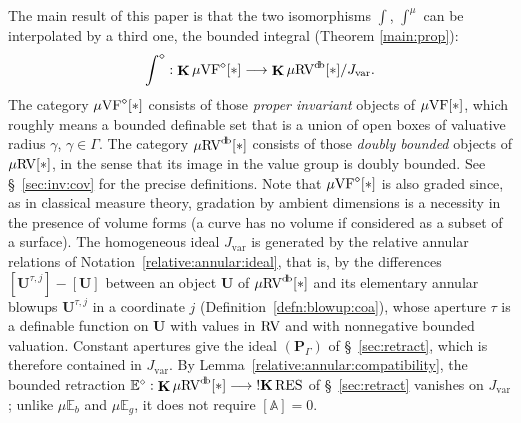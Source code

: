 \documentclass[12pt]{amsart}
\newcommand{\memph}[1]{{\color{magenta}\emph{#1}}}
\theoremstyle{plain}
\theoremstyle{definition}
\theoremstyle{remark}
\numberwithin{equation}{section}
\theoremstyle{plain}
\newcommand{\VF}{\textup{VF}}
\newcommand{\RV}{\textup{RV}}
\newcommand{\A}{\mathds{A}}
\newcommand{\0}{\emptyset}
\newcommand{\bb}[1]{\mathbb{#1}}
\newcommand{\fun}{\longrightarrow}
\newcommand{\mgVF}{{\mu} {\VF}}
\newcommand{\mgRV}{{\mu}{\RV}}
\newcommand{\RES}{\textup{RES}}
\newcommand{\mgE}{{\mu}{\bb E}}
\DeclareMathOperator{\ggk}{\mathbf{K}}
\DeclareMathOperator{\sggk}{!\mathbf{K}}
\DeclareMathOperator{\db}{d \! b}
\begin{document}
The main result of this paper is  that the two isomorphisms $\int$, $\int^\mu$ can be interpolated by a third one, the bounded integral (Theorem \ref{main:prop}):
\[
\int^\diamond : \ggk \mgVF^\diamond[*] \fun \ggk  \mgRV^{\db}[*] / J_{\mathrm{var}}.
\]
The category $\mgVF^\diamond[*]$ consists of those \memph{proper invariant} objects of $\mgVF[*]$, which roughly means a bounded definable set that is a union of open boxes of valuative radius $\gamma$, $\gamma \in \Gamma$. The category $\mgRV^{\db}[*]$ consists of those \memph{doubly bounded} objects of $\mgRV[*]$, in the sense that its image in the value group is doubly bounded. See \S~\ref{sec:inv:cov} for the precise definitions. Note that $\mgVF^{\diamond}[*]$  is also graded since, as in classical measure theory, gradation by ambient dimensions is a necessity in the presence of volume forms (a curve has no volume if considered as a subset of a surface). The homogeneous ideal $J_{\mathrm{var}}$ is generated by the relative annular relations of Notation~\ref{relative:annular:ideal}, that is, by the differences $[\bm U^{\tau, j}] - [\bm U]$ between an object $\bm U$ of $\mgRV^{\db}[*]$ and its elementary annular blowups $\bm U^{\tau, j}$ in a coordinate $j$ (Definition~\ref{defn:blowup:coa}), whose aperture $\tau$ is a definable function on $\bm U$ with values in $\RV$ and with nonnegative bounded valuation. Constant apertures give the ideal $(\bm P_\Gamma)$ of \S~\ref{sec:retract}, which is therefore contained in $J_{\mathrm{var}}$. By Lemma~\ref{relative:annular:compatibility}, the bounded retraction $\bb E^\diamond : \ggk \mgRV^{\db}[*] \fun \sggk \RES$ of \S~\ref{sec:retract} vanishes on $J_{\mathrm{var}}$; unlike $\mgE_{b}$ and $\mgE_{g}$, it does not require $[\A] = 0$.
\end{document}
